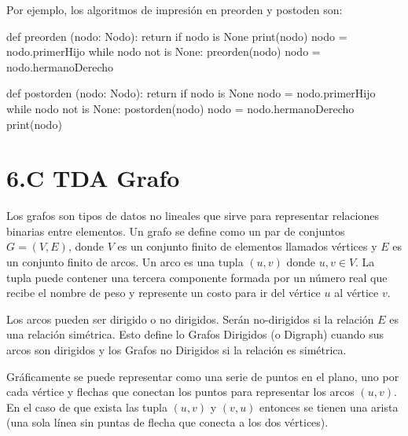 Por ejemplo, los algoritmos de impresión en preorden y postoden son:

\hfil
\begin{minipage}{.4\textwidth}
\begin{pyverbatim}[][frame=single]
def preorden (nodo: Nodo):
   return if nodo is None
   print(nodo)
   nodo = nodo.primerHijo
   while nodo not is None:
      preorden(nodo)
      nodo = nodo.hermanoDerecho
\end{pyverbatim}
\end{minipage}
\begin{minipage}{.4\textwidth}
\begin{pyverbatim}[][frame=single]
def postorden (nodo: Nodo):
   return if nodo is None
   nodo = nodo.primerHijo
   while nodo not is None:
      postorden(nodo)
      nodo = nodo.hermanoDerecho
   print(nodo)
\end{pyverbatim}
\end{minipage}






\section*{6.C TDA Grafo}
\label{sec:Grafo}

Los grafos son tipos de datos no lineales que sirve para representar relaciones binarias entre elementos.
Un grafo se define como un par de conjuntos $G=(V, E)$, donde $V$ es un conjunto finito de elementos llamados vértices y $E$ es un conjunto finito de arcos. Un arco es una tupla $(u, v)$ donde $u, v\in V$.
La tupla puede contener una tercera componente formada por un número real que recibe el nombre de peso y represente un costo para ir del vértice $u$ al vértice $v$.

Los arcos pueden ser dirigido o no dirigidos. Serán no-dirigidos si la relación $E$ es una relación simétrica. Esto define lo Grafos Dirigidos (o Digraph) cuando sus arcos son dirigidos y los Grafos no Dirigidos si la relación es simétrica. 

Gráficamente se puede representar como una serie de puntos en el plano, uno por cada vértice y flechas que conectan los puntos para representar los arcos $(u, v)$. En el caso de que exista las tupla $(u, v)$ y  $(v, u)$  entonces se tienen una arista (una sola línea sin puntas de flecha que conecta a los dos vértices). 


